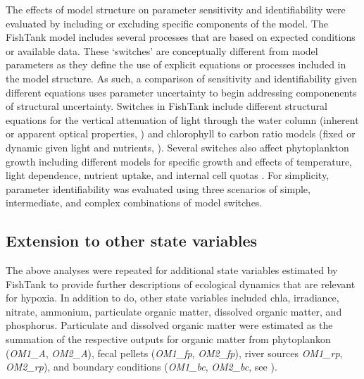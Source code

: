 \documentclass[letterpaper,12pt,oneside]{article}\usepackage[]{graphicx}\usepackage[]{color}
\begin{document}
The effects of model structure on parameter sensitivity and identifiability were evaluated by including or excluding specific components of the model.  The FishTank model includes several processes that are based on expected conditions or available data.  These `switches' are conceptually different from model parameters as they define the use of explicit equations or processes included in the model structure.  As such, a comparison of sensitivity and identifiability given different equations uses parameter uncertainty to begin addressing componenents of structural uncertainty.  Switches in FishTank include different structural equations for the vertical attenuation of light through the water column (inherent or apparent optical properties, \citealt{Penta09,Eldridge10}) and chlorophyll to carbon ratio models (fixed or dynamic given light and nutrients, \citealt{Cloern95}).  Several switches also affect phytoplankton growth including different models for specific growth and effects of temperature, light dependence, nutrient uptake, and internal cell quotas .  For simplicity, parameter identifiability was evaluated using three scenarios of simple, intermediate, and complex combinations of model switches.  

\subsection{Extension to other state variables}

The above analyses were repeated for additional state variables estimated by FishTank to provide further descriptions of ecological dynamics that are relevant for hypoxia.  In addition to \ac{do}, other state variables included \ac{chla}, irradiance, nitrate, ammonium, particulate organic matter, dissolved organic matter, and phosphorus.  Particulate and dissolved organic matter were estimated as the summation of the respective outputs for organic matter from phytoplankon (\textit{OM1\_A}, \textit{OM2\_A}), fecal pellets (\textit{OM1\_fp}, \textit{OM2\_fp}), river sources \textit{OM1\_rp}, \textit{OM2\_rp}), and boundary conditions (\textit{OM1\_bc}, \textit{OM2\_bc}, see ). 
\end{document}
